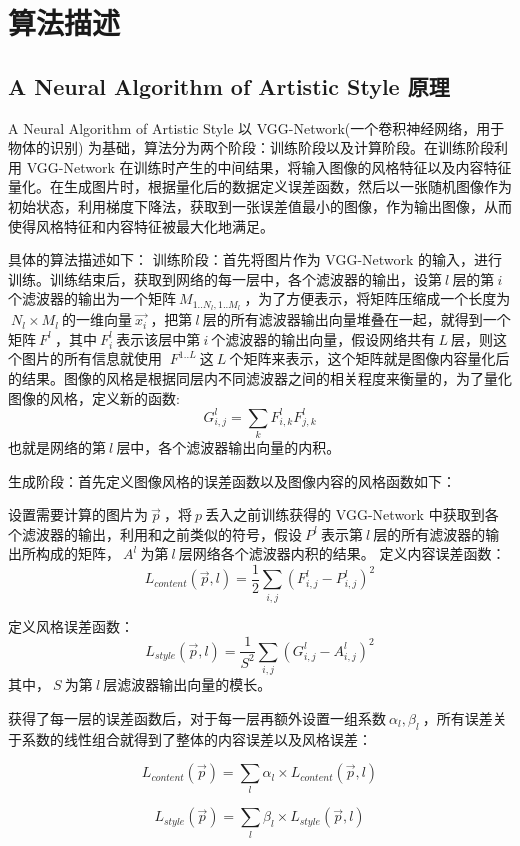 \documentclass[conference]{IEEEtran}
\begin{document}
\section{算法描述}

\subsection{A Neural Algorithm of Artistic Style 原理}

A Neural Algorithm of Artistic Style 以 VGG-Network(一个卷积神经网络，用于物体的识别) 为基础，算法分为两个阶段：训练阶段以及计算阶段。在训练阶段利用 VGG-Network 在训练时产生的中间结果，将输入图像的风格特征以及内容特征量化。在生成图片时，根据量化后的数据定义误差函数，然后以一张随机图像作为初始状态，利用梯度下降法，获取到一张误差值最小的图像，作为输出图像，从而使得风格特征和内容特征被最大化地满足。

具体的算法描述如下：
训练阶段：首先将图片作为 VGG-Network 的输入，进行训练。训练结束后，获取到网络的每一层中，各个滤波器的输出，设第$~l~$层的第$~i~$个滤波器的输出为一个矩阵$~M_{1..N_l,1..M_l}~$，为了方便表示，将矩阵压缩成一个长度为$~N_l \times M_l~$的一维向量$~\vec{x_{i}}~$，把第$~l~$层的所有滤波器输出向量堆叠在一起，就得到一个矩阵$~F^l~$，其中$~F^l_i~$表示该层中第$~i~$个滤波器的输出向量，假设网络共有$~L~$层，则这个图片的所有信息就使用 $~F^{1..L}~$这$~L~$个矩阵来表示，这个矩阵就是图像内容量化后的结果。图像的风格是根据同层内不同滤波器之间的相关程度来衡量的，为了量化图像的风格，定义新的函数:
$$~G^l_{i,j}=\sum_{k}F^l_{i,k}F^l_{j,k}~$$
也就是网络的第$~l~$层中，各个滤波器输出向量的内积。

生成阶段：首先定义图像风格的误差函数以及图像内容的风格函数如下：

设置需要计算的图片为$~\vec{p}~$，将$~p~$丢入之前训练获得的 VGG-Network 中获取到各个滤波器的输出，利用和之前类似的符号，假设$~P^{l}~$表示第$~l~$层的所有滤波器的输出所构成的矩阵，$~A^l~$为第$~l~$层网络各个滤波器内积的结果。
定义内容误差函数：
$$ L_{content}(\vec{p}, l)=\frac{1}{2}\sum_{i,j} (F^l_{i,j}-P^l_{i,j})^2 $$

定义风格误差函数：
$$ L_{style}(\vec{p}, l) = \frac{1}{S^2}\sum_{i,j}(G^l_{i,j}-A^l_{i,j})^2 $$
其中，$~S~$为第$~l~$层滤波器输出向量的模长。

获得了每一层的误差函数后，对于每一层再额外设置一组系数$~\alpha_l,\beta_l~$，所有误差关于系数的线性组合就得到了整体的内容误差以及风格误差：

$$L_{content}(\vec{p})=\sum_{l} \alpha_l \times L_{content}(\vec{p}, l)$$

$$L_{style}(\vec{p})=\sum_{l} \beta_l \times L_{style}(\vec{p}, l)$$
\end{document}
